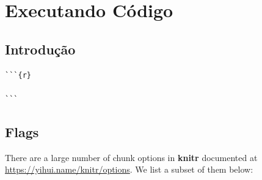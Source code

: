 \documentclass[
]{book}
\begin{document}
\hypertarget{executando-cuxf3digo}{%
\chapter{Executando Código}\label{executando-cuxf3digo}}

\hypertarget{introduuxe7uxe3o}{%
\section{Introdução}\label{introduuxe7uxe3o}}

\begin{verbatim}
```{r}

```
\end{verbatim}

\hypertarget{flags}{%
\section{Flags}\label{flags}}

There are a large number of chunk options in \textbf{knitr} documented at \url{https://yihui.name/knitr/options}. We list a subset of them below:
\end{document}
